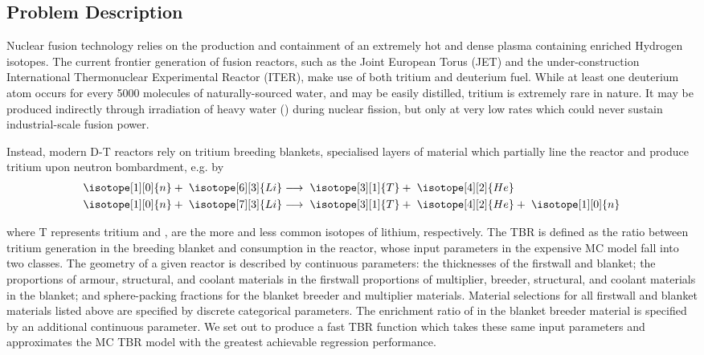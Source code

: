 \subsection{Problem Description}
\label{sec:problemdescription}

Nuclear fusion technology relies on the production and containment of an
extremely hot and dense plasma containing enriched Hydrogen isotopes. The current frontier generation of fusion reactors, such as the Joint European Torus (JET) and the
under-construction International Thermonuclear Experimental Reactor (ITER), make
use of both tritium and deuterium fuel. While at least one deuterium atom occurs for every \num{5000} molecules of naturally-sourced water, and may be easily distilled, tritium is extremely rare in nature. It may be produced indirectly through irradiation of heavy water
(\DDO) during nuclear fission, but only at very low rates which could
never sustain industrial-scale fusion power.

Instead, modern D-T reactors rely on tritium breeding blankets, specialised
layers of material which partially line the reactor and produce tritium upon
neutron bombardment, e.g. by 
\begin{eqnarray}
	\isotope[1][0]{n} + \hspace{3pt} \isotope[6][3]{Li} 
	&\longrightarrow \hspace{3pt} 
	\isotope[3][1]{T} + \hspace{3pt}\isotope[4][2]{He} \\
	\isotope[1][0]{n} + \hspace{3pt} \isotope[7][3]{Li} 
	&\longrightarrow \hspace{3pt} 
	\isotope[3][1]{T} + \hspace{3pt} \isotope[4][2]{He} + \hspace{3pt} \isotope[1][0]{n}
\end{eqnarray}

where T represents tritium and ,  are the more and
less common isotopes of lithium, respectively. The TBR is defined as the ratio between tritium generation in the breeding blanket and consumption in the reactor, whose input parameters in the expensive MC model fall
into two classes. The geometry of a given reactor is described by continuous parameters: the thicknesses of the firstwall and blanket; the proportions of armour, structural, and coolant materials in the firstwall proportions of multiplier, breeder, structural, and coolant materials in the blanket; and sphere-packing fractions for the blanket breeder and multiplier materials. Material selections for all firstwall and blanket materials listed above are specified by discrete
categorical parameters. The enrichment ratio of  in the blanket breeder material is specified by an additional continuous parameter. We set out to produce a fast TBR
function which takes these same input parameters and approximates the MC TBR
model with the greatest achievable regression performance.

